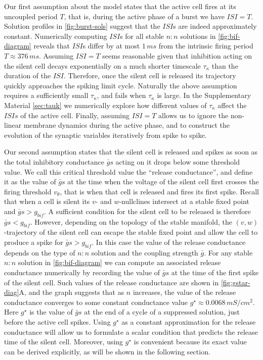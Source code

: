 Our first assumption about the model states that the active cell fires at its uncoupled period $T$, that is, during the active phase of a burst we have $ISI=T$.
Solution profiles in \cref{fig:burst-sols} suggest that the $ISI$s are indeed approximately constant.
Numerically computing $ISI$s for all stable $n:n$ solutions in \cref{fig:bif-diagram} reveals that $ISI$s differ by at most $1\, \si{ms}$ from the intrinsic firing period $T\approx 376\, \si{ms}$.
Assuming $ISI=T$ seems reasonable given that inhibition acting on the silent cell decays exponentially on a much shorter timescale $\tau_{\kappa}$ than the duration of the $ISI$. Therefore, once the silent cell is released its trajectory quickly approaches the spiking limit cycle.
Naturally the above assumption requires a sufficiently small $\tau_{\kappa}$, and fails when $\tau_{\kappa}$ is large.
In the Supplementary Material \cref{sec:tauk} we numerically explore how different values of $\tau_{\kappa}$ affect the $ISIs$ of the active cell.
Finally, assuming $ISI=T$ allows us to ignore the non-linear membrane dynamics during the active phase, and to construct the evolution of the synaptic variables iteratively from spike to spike.

Our second assumption states that the silent cell is released and spikes as soon as the total inhibitory conductance $\bar g s$ acting on it drops below some threshold value.
We call this critical threshold value the ``release conductance'', and define it as the value of $\bar g s$ at the time when the voltage of the silent cell first crosses the firing threshold $v_{\theta}$, that is when that cell is released and fires its first spike.
Recall that when a cell is silent its $v$- and $w$-nullclines intersect at a stable fixed point and $\bar g s > g_{bif}$.
A sufficient condition for the silent cell to be released is therefore $\bar g s < g_{bif}$.
However, depending on the topology of the stable manifold, the $(v,w)$-trajectory of the silent cell can escape the stable fixed point and allow the cell to produce a spike for $\bar g s > g_{bif}$.
In this case the value of the release conductance depends on the type of $n:n$ solution and the coupling strength $\bar g$.
For any stable $n:n$ solution in \cref{fig:bif-diagram} we can compute an associated release conductance numerically by recording the value of $\bar g s$ at the time of the first spike of the silent cell.
Such values of the release conductance are shown in \cref{fig:gstar-diag}A, and the graph suggests that as $n$ increases, the value of the release conductance converges to some constant conductance value $g^{\star} \approx 0.0068\, \si{mS/cm^2}$.
Here $g^{\star}$ is the value of $\bar g s$ at the end of a cycle of a suppressed solution, just before the active cell spikes.
Using $g^{\star}$ as a constant approximation for the release conductance will allow us to formulate a scalar condition that predicts the release time of the silent cell.
Moreover, using $g^{\star}$ is convenient because its exact value can be derived explicitly, as will be shown in the following section.

